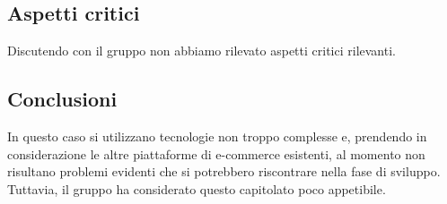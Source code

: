 \subsection{Aspetti critici}
Discutendo con il gruppo non abbiamo rilevato aspetti critici rilevanti.
\subsection{Conclusioni}
In questo caso si utilizzano tecnologie non troppo complesse e, prendendo in considerazione le altre piattaforme di e-commerce esistenti, al momento non risultano problemi evidenti che si potrebbero riscontrare nella fase di sviluppo. Tuttavia, il gruppo ha considerato questo capitolato poco appetibile.
